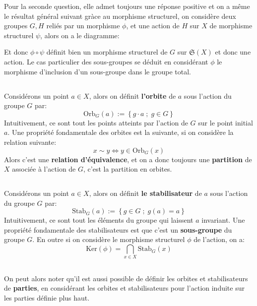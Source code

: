 Pour la seconde question, elle admet toujours une réponse positive et on a même le résultat général suivant gràce au morphisme structurel, on considère deux groupes \( G, H \) reliés par un morphisme \( \phi \), et une action de \( H \) sur \( X \) de morphisme structurel \( \psi \), alors on a le diagramme:
\begin{center}
\end{center}
Et donc \( \phi \circ \psi \) définit bien un morphisme structurel de \( G \) sur \( \mathfrak{S}(X) \) et donc une action. Le cas particulier des sous-groupes se déduit en considérant \( \phi \) le morphisme d'inclusion d'un sous-groupe dans le groupe total.
\pagebreak
\subsection*{}
Considérons un point \( a \in X \), alors on définit \textbf{l'orbite} de \( a \) sous l'action du groupe \( G \) par:
\[ 
   \text{Orb}_G(a) := \left\{ g \cdot a \; ; \; g \in G \right\} 
\]
Intuitivement, ce sont tout les points atteints par l'action de \( G \) sur le point initial \( a \). Une propriété fondamentale des orbites est la suivante, si on considère la relation suivante:
\[ 
   x \sim y \iff y \in \text{Orb}_G(x)
\]
Alors c'est une \textbf{relation d'équivalence}, et on a donc toujours une \textbf{partition} de \( X \) associée à l'action de \( G \), c'est la partition en orbites.
\subsection*{}
Considérons un point \( a \in X \), alors on définit \textbf{le stabilisateur} de \( a \) sous l'action du groupe \( G \) par:
\[ 
   \text{Stab}_G(a) := \left\{ g \in G \; ; \; g(a) = a\right\} 
\]
Intuitivement, ce sont tout les éléments du groupe qui laissent \( a \) invariant. Une propriété fondamentale des stabilisateurs est que c'est un \textbf{sous-groupe} du groupe \( G \). En outre si on considère le morphisme structurel \( \phi \) de l'action, on a:
\[ 
   \text{Ker}( \phi) = \bigcap_{x \in X} \text{Stab}_G(x) 
\]
\subsection*{}
On peut alors noter qu'il est aussi possible de définir les orbites et stabilisateurs de \textbf{parties}, en considérant les orbites et stabilisateurs pour l'action induite sur les parties définie plus haut.
